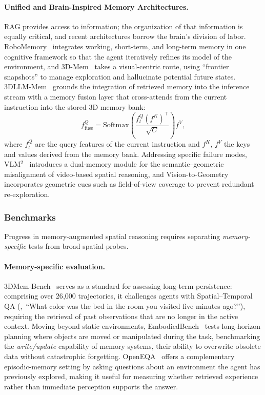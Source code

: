 \paragraph{Unified and Brain-Inspired Memory Architectures.}
RAG provides access to information; the organization of that information is equally critical, and recent architectures borrow the brain's division of labor. RoboMemory~\cite{lei2025robomemory} integrates working, short-term, and long-term memory in one cognitive framework so that the agent iteratively refines its model of the environment, and 3D-Mem~\cite{yang20253dmem} takes a visual-centric route, using ``frontier snapshots'' to manage exploration and hallucinate potential future states. 3DLLM-Mem~\cite{hu20253dllmmem} grounds the integration of retrieved memory into the inference stream with a memory fusion layer that cross-attends from the current instruction into the stored 3D memory bank:
\begin{equation}
f^Q_{\text{fuse}} = \mathrm{Softmax}\!\left( \frac{f^Q_t (f^K)^\top}{\sqrt{C}} \right) f^V,
\end{equation}
where $f^Q_t$ are the query features of the current instruction and $f^K$, $f^V$ the keys and values derived from the memory bank. Addressing specific failure modes, VLM$^2$~\cite{liu2025vision} introduces a dual-memory module for the semantic--geometric misalignment of video-based spatial reasoning, and Vision-to-Geometry~\cite{cai2025vision} incorporates geometric cues such as field-of-view coverage to prevent redundant re-exploration.



\subsubsection{Benchmarks}
Progress in memory-augmented spatial reasoning requires separating \emph{memory-specific} tests from broad spatial probes.

\paragraph{Memory-specific evaluation.}
3DMem-Bench~\cite{hu20253dllmmem} serves as a standard for assessing long-term persistence: comprising over 26{,}000 trajectories, it challenges agents with Spatial--Temporal QA (\eg,\ ``What color was the bed in the room you visited five minutes ago?''), requiring the retrieval of past observations that are no longer in the active context. Moving beyond static environments, EmbodiedBench~\cite{yang2025embodiedbench} tests long-horizon planning where objects are moved or manipulated during the task, benchmarking the \emph{write/update} capability of memory systems, their ability to overwrite obsolete data without catastrophic forgetting. OpenEQA~\cite{majumdar2024openeqa} offers a complementary episodic-memory setting by asking questions about an environment the agent has previously explored, making it useful for measuring whether retrieved experience rather than immediate perception supports the answer.

